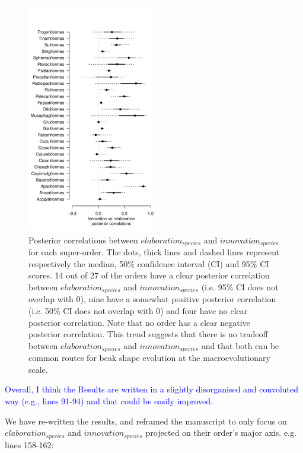 \documentclass[12pt,letterpaper]{article}
\begin{document}
\begin{figure}[!htbp]
\centering
   \includegraphics[width=0.5\textwidth]{Figures/correlations_fable_orders.pdf}
\caption{Posterior correlations between $elaboration_{species}$ and $innovation_{species}$ for each super-order. The dots, thick lines and dashed lines represent respectively the median, 50\% confidence interval (CI) and 95\% CI scores. 14 out of 27 of the orders have a clear posterior correlation between $elaboration_{species}$ and $innovation_{species}$ (i.e. 95\% CI does not overlap with 0), nine have a somewhat positive posterior correlation (i.e. 50\% CI does not overlap with 0) and four have no clear posterior correlation. Note that no order has a clear negative posterior correlation. This trend suggests that there is no tradeoff between $elaboration_{species}$ and $innovation_{species}$ and that both can be common routes for beak shape evolution at the macroevolutionary scale.
}
\label{fable_correlations}
\end{figure}
\bigskip

\newpage

\textcolor{blue}{Overall, I think the Results are written in a slightly disorganised and convoluted way (e.g., lines 91-94) and that could be easily improved.}

We have re-written the results, and reframed the manuscript to only focus on $elaboration_{species}$ and $innovation_{species}$ projected on their order’s major axis. e.g. lines 158-162:
\end{document}
